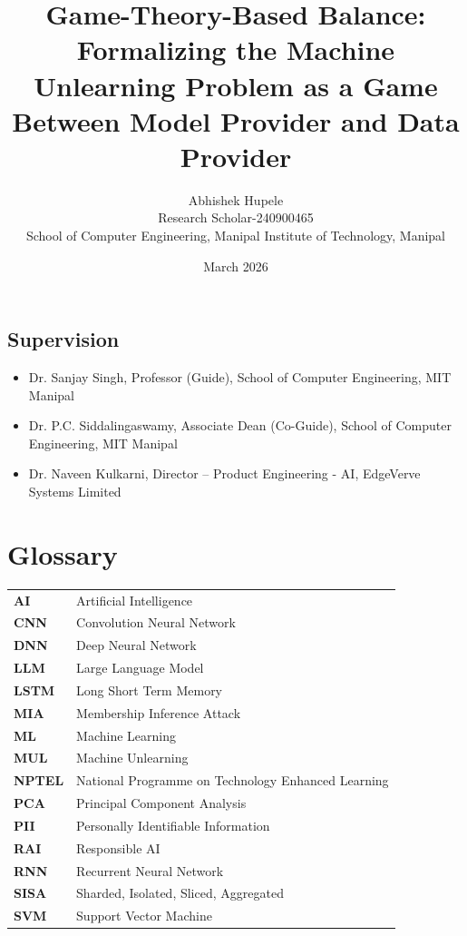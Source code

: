 \documentclass[12pt,a4paper]{report}
\begin{document}
\title{Game-Theory-Based Balance: Formalizing the Machine Unlearning Problem as a Game Between Model Provider and Data Provider}
\author{Abhishek Hupele \\ Research Scholar-240900465 \\ School of Computer Engineering, Manipal Institute of Technology, Manipal}
\date{March 2026}
\maketitle

\section*{Supervision}
\begin{itemize}
    \item Dr. Sanjay Singh, Professor (Guide), School of Computer Engineering, MIT Manipal
    \item Dr. P.C. Siddalingaswamy, Associate Dean (Co-Guide), School of Computer Engineering, MIT Manipal
    \item Dr. Naveen Kulkarni, Director – Product Engineering - AI, EdgeVerve Systems Limited
\end{itemize}
\newpage
\tableofcontents
\listoffigures
\listoftables

\chapter*{Glossary}
\begin{longtable}{>{\bfseries}p{3cm} p{10cm}}
AI & Artificial Intelligence \\
CNN & Convolution Neural Network \\
DNN & Deep Neural Network \\
LLM & Large Language Model \\
LSTM & Long Short Term Memory \\
MIA & Membership Inference Attack \\
ML & Machine Learning \\
MUL & Machine Unlearning \\
NPTEL & National Programme on Technology Enhanced Learning \\
PCA & Principal Component Analysis \\
PII & Personally Identifiable Information \\
RAI & Responsible AI \\
RNN & Recurrent Neural Network \\
SISA & Sharded, Isolated, Sliced, Aggregated \\
SVM & Support Vector Machine \\
\end{longtable}
\end{document}
